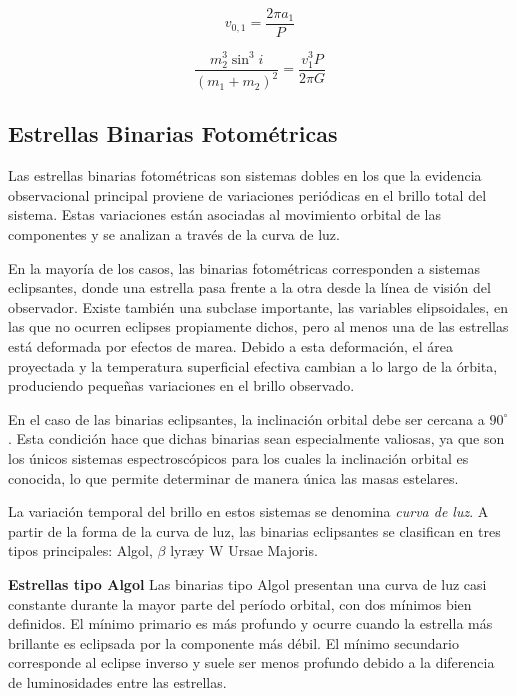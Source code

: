\documentclass[12pt,letterpaper,oneside]{book}
\begin{document}
\begin{equation}
    v_{0,1}=\frac{2\pi a_1}{P}
    \label{eq:velocidad_orbital_verdadera_espectro}
\end{equation}

\begin{equation}
    \frac{m^3_2 \sin^3{i}}{(m_1+m_2)^2}=\frac{v^3_1P}{2\pi G}
    \label{eq:funcion_masa_espectro}
\end{equation}
   
\subsection{Estrellas Binarias Fotométricas}
Las estrellas binarias fotométricas son sistemas dobles en los que la evidencia observacional principal proviene de variaciones periódicas en el brillo total del sistema. Estas variaciones están asociadas al movimiento orbital de las componentes y se analizan a través de la curva de luz.

En la mayoría de los casos, las binarias fotométricas corresponden a sistemas eclipsantes, donde una estrella pasa frente a la otra desde la línea de visión del observador. Existe también una subclase importante, las variables elipsoidales, en las que no ocurren eclipses propiamente dichos, pero al menos una de las estrellas está deformada por efectos de marea. Debido a esta deformación, el área proyectada y la temperatura superficial efectiva cambian a lo largo de la órbita, produciendo pequeñas variaciones en el brillo observado.

En el caso de las binarias eclipsantes, la inclinación orbital debe ser cercana a $90^\circ$. Esta condición hace que dichas binarias sean especialmente valiosas, ya que son los únicos sistemas espectroscópicos para los cuales la inclinación orbital es conocida, lo que permite determinar de manera única las masas estelares.

La variación temporal del brillo en estos sistemas se denomina \emph{curva de luz}. A partir de la forma de la curva de luz, las binarias eclipsantes se clasifican en tres tipos principales: Algol, $\beta$ lyr\ae y W Ursae Majoris.

\textbf{Estrellas tipo Algol} Las binarias tipo Algol presentan una curva de luz casi constante durante la mayor parte del período orbital, con dos mínimos bien definidos. El mínimo primario es más profundo y ocurre cuando la estrella más brillante es eclipsada por la componente más débil. El mínimo secundario corresponde al eclipse inverso y suele ser menos profundo debido a la diferencia de luminosidades entre las estrellas.
\end{document}
